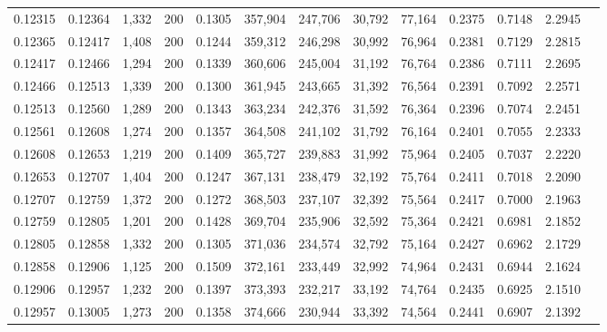 \begin{tabular}{rrrrrrrrrrrrr}
0.12315 & 0.12364 & 1,332 & 200 &                                     0.1305 & 357,904 & 247,706 &  30,792 &  77,164 & 0.2375 & 0.7148 & 2.2945 \\
0.12365 & 0.12417 & 1,408 & 200 &                                     0.1244 & 359,312 & 246,298 &  30,992 &  76,964 & 0.2381 & 0.7129 & 2.2815 \\
0.12417 & 0.12466 & 1,294 & 200 &                                     0.1339 & 360,606 & 245,004 &  31,192 &  76,764 & 0.2386 & 0.7111 & 2.2695 \\
0.12466 & 0.12513 & 1,339 & 200 &                                     0.1300 & 361,945 & 243,665 &  31,392 &  76,564 & 0.2391 & 0.7092 & 2.2571 \\
0.12513 & 0.12560 & 1,289 & 200 &                                     0.1343 & 363,234 & 242,376 &  31,592 &  76,364 & 0.2396 & 0.7074 & 2.2451 \\
0.12561 & 0.12608 & 1,274 & 200 &                                     0.1357 & 364,508 & 241,102 &  31,792 &  76,164 & 0.2401 & 0.7055 & 2.2333 \\
0.12608 & 0.12653 & 1,219 & 200 &                                     0.1409 & 365,727 & 239,883 &  31,992 &  75,964 & 0.2405 & 0.7037 & 2.2220 \\
0.12653 & 0.12707 & 1,404 & 200 &                                     0.1247 & 367,131 & 238,479 &  32,192 &  75,764 & 0.2411 & 0.7018 & 2.2090 \\
0.12707 & 0.12759 & 1,372 & 200 &                                     0.1272 & 368,503 & 237,107 &  32,392 &  75,564 & 0.2417 & 0.7000 & 2.1963 \\
0.12759 & 0.12805 & 1,201 & 200 &                                     0.1428 & 369,704 & 235,906 &  32,592 &  75,364 & 0.2421 & 0.6981 & 2.1852 \\
0.12805 & 0.12858 & 1,332 & 200 &                                     0.1305 & 371,036 & 234,574 &  32,792 &  75,164 & 0.2427 & 0.6962 & 2.1729 \\
0.12858 & 0.12906 & 1,125 & 200 &                                     0.1509 & 372,161 & 233,449 &  32,992 &  74,964 & 0.2431 & 0.6944 & 2.1624 \\
0.12906 & 0.12957 & 1,232 & 200 &                                     0.1397 & 373,393 & 232,217 &  33,192 &  74,764 & 0.2435 & 0.6925 & 2.1510 \\
0.12957 & 0.13005 & 1,273 & 200 &                                     0.1358 & 374,666 & 230,944 &  33,392 &  74,564 & 0.2441 & 0.6907 & 2.1392 \\

\end{tabular}
